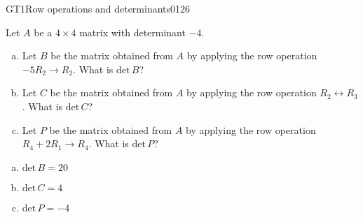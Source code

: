 \begin{exercise}{GT1}{Row operations and determinants}{0126} 
\begin{exerciseStatement} 

Let \(A\) be a \(4 \times 4\) matrix with determinant \(-4\).

 

\begin{enumerate}[(a)]
\item Let \(B\) be the matrix obtained from \(A\) by applying the row operation \(-5 R_2 \to R_2\). What is \(\mathrm{det}\,B\)?
\item Let \(C\) be the matrix obtained from \(A\) by applying the row operation \(R_2 \leftrightarrow R_3\). What is \(\mathrm{det}\,C\)?
\item Let \(P\) be the matrix obtained from \(A\) by applying the row operation \(R_4 + 2 R_1 \to R_4\). What is \(\mathrm{det}\,P\)?
\end{enumerate}

     \end{exerciseStatement}
 \begin{exerciseAnswer} 

\begin{enumerate}[(a)]
\item \(\mathrm{det}\,B=20\)
\item \(\mathrm{det}\,C=4\)
\item \(\mathrm{det}\,P=-4\)
\end{enumerate}

     \end{exerciseAnswer}
 \end{exercise}


\newpage




